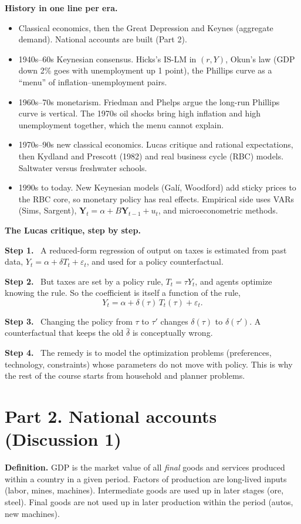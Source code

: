 \documentclass[12pt]{article}
\newcommand{\st}[1]{\par\smallskip\textbf{Step #1.}\ }
\begin{document}
\textbf{History in one line per era.}
\begin{itemize}
\item Classical economics, then the Great Depression and Keynes (aggregate demand). National accounts are built (Part 2).
\item 1940s--60s Keynesian consensus. Hicks's IS-LM in $(r,Y)$, Okun's law (GDP down 2\% goes with unemployment up 1 point), the Phillips curve as a ``menu'' of inflation--unemployment pairs.
\item 1960s--70s monetarism. Friedman and Phelps argue the long-run Phillips curve is vertical. The 1970s oil shocks bring high inflation and high unemployment together, which the menu cannot explain.
\item 1970s--90s new classical economics. Lucas critique and rational expectations, then Kydland and Prescott (1982) and real business cycle (RBC) models. Saltwater versus freshwater schools.
\item 1990s to today. New Keynesian models (Gal\'i, Woodford) add sticky prices to the RBC core, so monetary policy has real effects. Empirical side uses VARs (Sims, Sargent), $\mathbf Y_t=\alpha+B\mathbf Y_{t-1}+u_t$, and microeconometric methods.
\end{itemize}

\textbf{The Lucas critique, step by step.}
\st{1} A reduced-form regression of output on taxes is estimated from past data,
$Y_t=\alpha+\delta T_t+\varepsilon_t$, and used for a policy counterfactual.
\st{2} But taxes are set by a policy rule, $T_t=\tau Y_t$, and agents optimize
knowing the rule. So the coefficient is itself a function of the rule,
\[
Y_t=\alpha+\delta(\tau)\,T_t(\tau)+\varepsilon_t .
\]
\st{3} Changing the policy from $\tau$ to $\tau'$ changes $\delta(\tau)$ to
$\delta(\tau')$. A counterfactual that keeps the old $\hat\delta$ is
conceptually wrong.
\st{4} The remedy is to model the optimization problems (preferences,
technology, constraints) whose parameters do not move with policy. This is why
the rest of the course starts from household and planner problems.

\section*{Part 2. National accounts (Discussion 1)}

\textbf{Definition.} GDP is the market value of all \emph{final} goods and
services produced within a country in a given period. Factors of production are
long-lived inputs (labor, mines, machines). Intermediate goods are used up in
later stages (ore, steel). Final goods are not used up in later production
within the period (autos, new machines).
\end{document}
